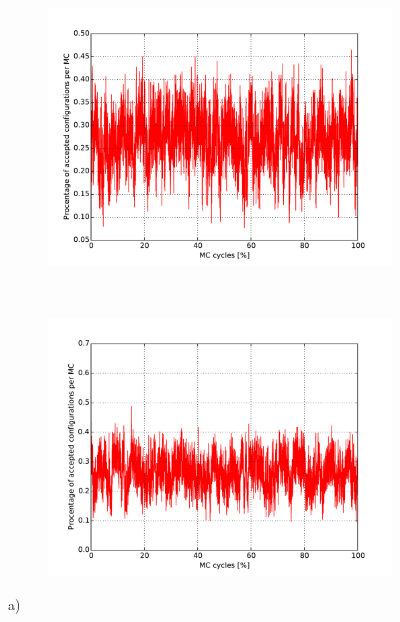 \begin{figure}[H]
    \centering
    \begin{subfigure}{0.5\textwidth}
        \centering
        \includegraphics[width=\linewidth]{result/bilder/config/energy22-MC1000000T24-configN20}
        \caption{}
    \end{subfigure}%
    ~ 
    \begin{subfigure}{0.5\textwidth}
        \centering
        \includegraphics[width=\linewidth]{result/bilder/config/energy22-MC1000000T24-config-RNGN20}
        \caption{}
    \end{subfigure}
    \caption{a) }
    \label{fig:config-T24}
\end{figure}



















